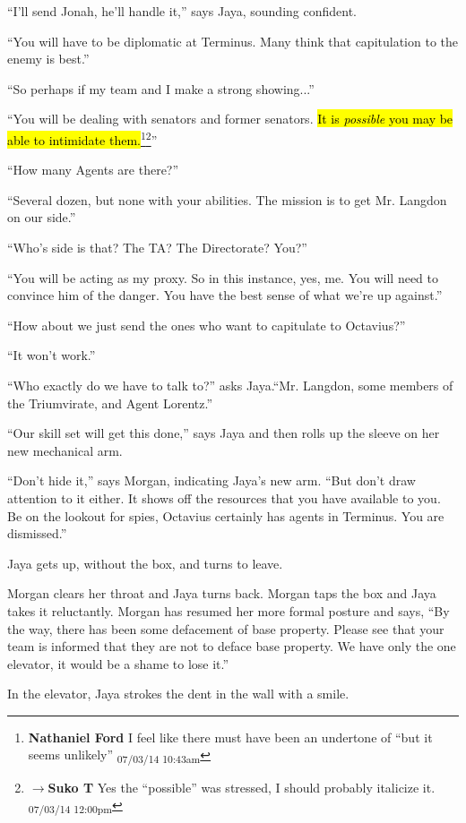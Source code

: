 ``I'll send Jonah, he'll handle it,'' says Jaya, sounding confident.

``You will have to be diplomatic at Terminus.  Many think that capitulation to the enemy is best.''

``So perhaps if my team and I make a strong showing...''

``You will be dealing with senators and former senators.  \hl{It is \textit{possible }you may be able to intimidate them.}\footnote{\textbf{Nathaniel Ford }I feel like there must have been an undertone of ``but it seems unlikely'' \textsubscript{07/03/14 10:43am}}\footnote{$\rightarrow$\textbf{Suko T }Yes the ``possible'' was stressed, I should probably italicize it. \textsubscript{07/03/14 12:00pm}}''

``How many Agents are there?''

``Several dozen, but none with your abilities.  The mission is to get Mr. Langdon on our side.''

``Who's side is that?  The TA?  The Directorate?  You?''

``You will be acting as my proxy.  So in this instance, yes, me.  You will need to convince him of the danger.  You have the best sense of what we're up against.''

``How about we just send the ones who want to capitulate to Octavius?''

``It won't work.''

``Who exactly do we have to talk to?'' asks Jaya.``Mr. Langdon, some members of the Triumvirate, and Agent Lorentz.''

``Our skill set will get this done,'' says Jaya and then rolls up the sleeve on her new mechanical arm.

``Don't hide it,'' says Morgan, indicating Jaya's new arm. ``But don't draw attention to it either.  It shows off the resources that you have available to you.  Be on the lookout for spies, Octavius certainly has agents in Terminus.  You are dismissed.''

Jaya gets up, without the box, and turns to leave.

Morgan clears her throat and Jaya turns back.  Morgan taps the box and Jaya takes it reluctantly.  Morgan has resumed her more formal posture and says, ``By the way, there has been some defacement of base property.  Please see that your team is informed that they are not to deface base property.  We have only the one elevator, it would be a shame to lose it.''

In the elevator, Jaya strokes the dent in the wall with a smile.




